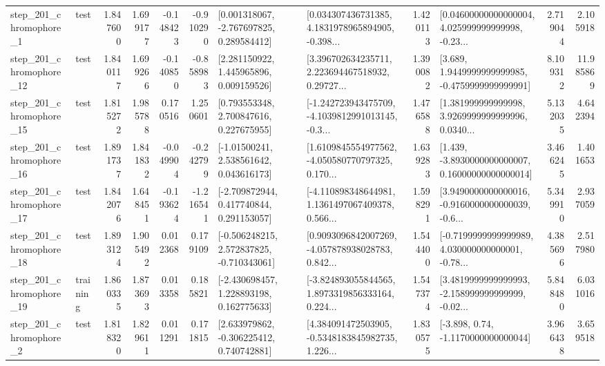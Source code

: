 \begin{tabular}{llrrrrllrlrr}
   step\_201\_chromophore\_1 &      test &      1.847600 &    1.699177 &     -0.148423 & -0.910290 &    [0.001318067, -2.767697825, 0.289584412] &  [0.034307436731385, 4.1831978965894905, -0.398... &       1.420113 &  [0.04600000000000004, 4.025999999999998, -0.23... &            2.719044 &          2.105918 \\
  step\_201\_chromophore\_12 &      test &      1.840117 &    1.699266 &     -0.140850 & -0.858983 &     [2.281150922, 1.445965896, 0.009159526] &  [3.396702634235711, 2.223694467518932, 0.29727... &       1.390082 &   [3.689, 1.9449999999999985, -0.4759999999999991] &            8.109312 &         11.985869 \\
  step\_201\_chromophore\_15 &      test &      1.815272 &    1.985788 &      0.170516 &  1.250601 &     [0.793553348, 2.700847616, 0.227675955] &  [-1.242723943475709, -4.1039812991013145, -0.3... &       1.476588 &  [1.381999999999998, 3.9269999999999996, 0.0340... &            5.132035 &          4.642394 \\
  step\_201\_chromophore\_16 &      test &      1.891737 &    1.841832 &     -0.049904 & -0.242799 &     [-1.01500241, 2.538561642, 0.043616173] &  [1.6109845554977562, -4.050580770797325, 0.170... &       1.639283 &  [1.439, -3.8930000000000007, 0.16000000000000014] &            3.466245 &          1.401653 \\
  step\_201\_chromophore\_17 &      test &      1.842076 &    1.648451 &     -0.193624 & -1.216541 &    [-2.709872944, 0.417740844, 0.291153057] &  [-4.110898348644981, 1.1361497067409378, 0.566... &       1.598291 &  [3.9490000000000016, -0.9160000000000039, -0.6... &            5.349910 &          2.937059 \\
  step\_201\_chromophore\_18 &      test &      1.893124 &    1.905492 &      0.012368 &  0.179109 &   [-0.506248215, 2.572837825, -0.710343061] &  [0.9093096842007269, -4.057878938028783, 0.842... &       1.544400 &  [-0.7199999999999989, 4.030000000000001, -0.78... &            4.385696 &          2.517980 \\
  step\_201\_chromophore\_19 &  training &      1.860335 &    1.873693 &      0.013358 &  0.185821 &    [-2.430698457, 1.228893198, 0.162775633] &  [-3.824893055844565, 1.8973319856333164, 0.224... &       1.547374 &  [3.4819999999999993, -2.158999999999999, -0.02... &            5.848480 &          6.031016 \\
   step\_201\_chromophore\_2 &      test &      1.818320 &    1.829611 &      0.011291 &  0.171815 &    [2.633979862, -0.306225412, 0.740742881] &  [4.384091472503905, -0.5348183845982735, 1.226... &       1.830575 &                [-3.898, 0.74, -1.1170000000000044] &            3.966438 &          3.659518 \\

\end{tabular}
